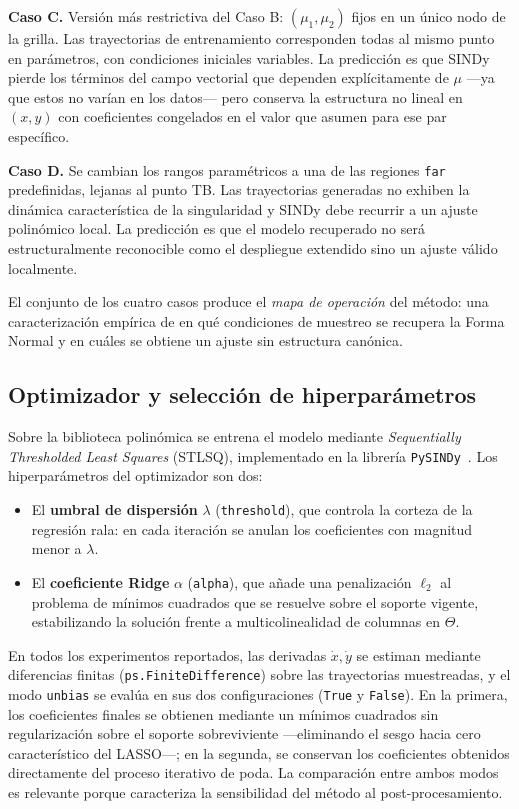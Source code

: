 \textbf{Caso C.} Versión más restrictiva del Caso B: $(\mu_1, \mu_2)$ fijos en un único nodo de la grilla. Las trayectorias de entrenamiento corresponden todas al mismo punto en parámetros, con condiciones iniciales variables. La predicción es que SINDy pierde los términos del campo vectorial que dependen explícitamente de $\mu$ —ya que estos no varían en los datos— pero conserva la estructura no lineal en $(x, y)$ con coeficientes congelados en el valor que asumen para ese par específico.

\textbf{Caso D.} Se cambian los rangos paramétricos a una de las regiones \texttt{far} predefinidas, lejanas al punto TB. Las trayectorias generadas no exhiben la dinámica característica de la singularidad y SINDy debe recurrir a un ajuste polinómico local. La predicción es que el modelo recuperado no será estructuralmente reconocible como el despliegue extendido sino un ajuste válido localmente.

El conjunto de los cuatro casos produce el \textit{mapa de operación} del método: una caracterización empírica de en qué condiciones de muestreo se recupera la Forma Normal y en cuáles se obtiene un ajuste sin estructura canónica.

\subsection{Optimizador y selección de hiperparámetros}

Sobre la biblioteca polinómica se entrena el modelo mediante \textit{Sequentially Thresholded Least Squares} (STLSQ), implementado en la librería \texttt{PySINDy}~\cite{desilva2020pysindy}. Los hiperparámetros del optimizador son dos:

\begin{itemize}
    \item El \textbf{umbral de dispersión} $\lambda$ (\texttt{threshold}), que controla la corteza de la regresión rala: en cada iteración se anulan los coeficientes con magnitud menor a $\lambda$.
    \item El \textbf{coeficiente Ridge} $\alpha$ (\texttt{alpha}), que añade una penalización $\ell_2$ al problema de mínimos cuadrados que se resuelve sobre el soporte vigente, estabilizando la solución frente a multicolinealidad de columnas en $\Theta$.
\end{itemize}

En todos los experimentos reportados, las derivadas $\dot{x}, \dot{y}$ se estiman mediante diferencias finitas (\texttt{ps.FiniteDifference}) sobre las trayectorias muestreadas, y el modo \texttt{unbias} se evalúa en sus dos configuraciones (\texttt{True} y \texttt{False}). En la primera, los coeficientes finales se obtienen mediante un mínimos cuadrados sin regularización sobre el soporte sobreviviente —eliminando el sesgo hacia cero característico del LASSO—; en la segunda, se conservan los coeficientes obtenidos directamente del proceso iterativo de poda. La comparación entre ambos modos es relevante porque caracteriza la sensibilidad del método al post-procesamiento.

